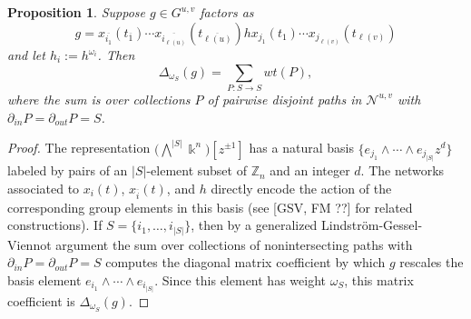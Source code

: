 \documentclass[12pt]{amsart}
\newcommand{\CC}{\mathbb{C}}
\newcommand{\ZZ}{\mathbb{Z}}
\newcommand{\kk}{\Bbbk}%
\newcommand{\cN}{\mathcal{N}} %
\newcommand{\ol}[1]{\overline{#1}}
\newtheorem{proposition}[theorem]{Proposition}
\theoremstyle{remark}
\numberwithin{equation}{section}
\numberwithin{figure}{section}
\begin{document}
\begin{proposition}\label{prop:minorsfrompaths}
  Suppose $g\in G^{u,v}$ factors as %
\[
g = x_{\ol{i_1}}(t_{\ol{1}})\cdots x_{\ol{i_{\ell(u)}}}(t_{\ol{\ell(u)}})hx_{j_1}(t_{1}) \cdots x_{j_{\ell(v)}}(t_{\ell(v)})
\]
and let $h_i:= h^{\omega_i}$. Then \[ \Delta_{\omega_S}(g) = \sum_{P: S \to S} wt(P), \]
  where the sum is over collections $P$ of pairwise disjoint paths in $\cN^{u,v}$ with $\partial_{in}P = \partial_{out}P = S$.
\end{proposition}
\begin{proof}
  The representation $\big(\bigwedge^{|S|}\kk^n\big)[z^{\pm 1}]$ has a natural basis $\{ e_{j_1} \wedge \cdots \wedge e_{j_{|S|}} z^d\}$ labeled by pairs of an $|S|$-element subset of $\ZZ_n$ and an integer $d$. The networks associated to $x_i(t)$, $x_{\ol{i}}(t)$, and $h$ directly encode the action of the corresponding group elements in this basis (see [GSV, FM ??] for related constructions). If $S = \{i_1,\dotsc,i_{|S|}\}$, then by a generalized Lindstr\"om-Gessel-Viennot argument the sum over collections of nonintersecting paths with $\partial_{in}P = \partial_{out}P = S$ computes the diagonal matrix coefficient by which $g$ rescales the basis element $e_{i_1} \wedge \cdots \wedge e_{i_{|S|}}$. Since this element has weight $\omega_S$, this matrix coefficient is $\Delta_{\omega_S}(g)$. 
\end{proof}
\end{document}
